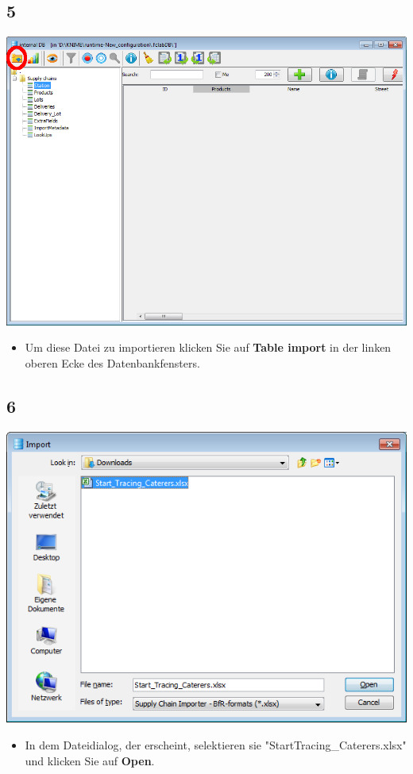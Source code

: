 \documentclass{beamer}
\begin{document}
\subsection{5}
\begin{frame}
	\begin{center}
  		\includegraphics[height=0.6\textheight]{5.png}
	\end{center}
	\begin{itemize}
		\item Um diese Datei zu importieren klicken Sie auf  \textbf{Table import} in der linken oberen Ecke des Datenbankfensters.
	\end{itemize}
\end{frame}

\subsection{6}
\begin{frame}
	\begin{center}
  		\includegraphics[height=0.5\textheight]{6.png}
	\end{center}
	\begin{itemize}
		\item In dem Dateidialog, der erscheint, selektieren sie "StartTracing\_Caterers.xlsx" und klicken Sie auf \textbf{Open}.
	\end{itemize}
\end{frame}
\end{document}
